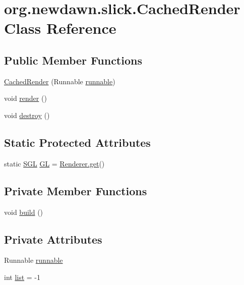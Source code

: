 \hypertarget{classorg_1_1newdawn_1_1slick_1_1_cached_render}{}\section{org.\+newdawn.\+slick.\+Cached\+Render Class Reference}
\label{classorg_1_1newdawn_1_1slick_1_1_cached_render}
\subsection*{Public Member Functions}
\begin{DoxyCompactItemize}
\item 
\mbox{\hyperlink{classorg_1_1newdawn_1_1slick_1_1_cached_render_ad3b6420296d51324138f0a14d354c7db}{Cached\+Render}} (Runnable \mbox{\hyperlink{classorg_1_1newdawn_1_1slick_1_1_cached_render_adbb423a793a3b64353bf95ccdf9a99e9}{runnable}})
\item 
void \mbox{\hyperlink{classorg_1_1newdawn_1_1slick_1_1_cached_render_a9482132cdcf677dac93768e4161b5dfe}{render}} ()
\item 
void \mbox{\hyperlink{classorg_1_1newdawn_1_1slick_1_1_cached_render_a194e9daac130a45cdcb6ea944819a4e2}{destroy}} ()
\end{DoxyCompactItemize}
\subsection*{Static Protected Attributes}
\begin{DoxyCompactItemize}
\item 
static \mbox{\hyperlink{interfaceorg_1_1newdawn_1_1slick_1_1opengl_1_1renderer_1_1_s_g_l}{S\+GL}} \mbox{\hyperlink{classorg_1_1newdawn_1_1slick_1_1_cached_render_ac66ef801567b1c74e2cb8d5f47045dc4}{GL}} = \mbox{\hyperlink{classorg_1_1newdawn_1_1slick_1_1opengl_1_1renderer_1_1_renderer_abe742c3a7dfca67c6c01821d27087308}{Renderer.\+get}}()
\end{DoxyCompactItemize}
\subsection*{Private Member Functions}
\begin{DoxyCompactItemize}
\item 
void \mbox{\hyperlink{classorg_1_1newdawn_1_1slick_1_1_cached_render_a7631a43ef217b03800f81030b8636487}{build}} ()
\end{DoxyCompactItemize}
\subsection*{Private Attributes}
\begin{DoxyCompactItemize}
\item 
Runnable \mbox{\hyperlink{classorg_1_1newdawn_1_1slick_1_1_cached_render_adbb423a793a3b64353bf95ccdf9a99e9}{runnable}}
\item 
int \mbox{\hyperlink{classorg_1_1newdawn_1_1slick_1_1_cached_render_a0f2a2eb4568a66cd3b2c3bc6d7e6ad83}{list}} = -\/1
\end{DoxyCompactItemize}


